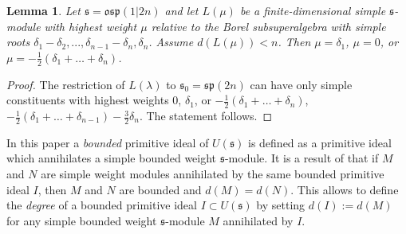 \documentclass[12pt]{amsart}
\makeatletter
\def\@putname#1#2#3#4{\def\@@ref{#3}\let\old@bf\bf
        \def\bf##1{\old@bf\if?\noexpand##1?{#4}\else##1\fi}%
	#1{#2}%
        \let\bf\old@bf}
\def\@putname#1#2#3#4{\def\@@ref{#3}\let\old@bf\bf	%
	\let\old@reset@font\reset@font			%
        \def\bf##1{\old@bf\if?\noexpand##1?{#4}\else##1\fi}%
	\def\reset@font##1##2{\old@reset@font##1\if?\noexpand##2?{#4}\else##2\fi}#1{#2}%
        \let\bf\old@bf\let\reset@font\old@reset@font}
\let\my@cite=\cite
\def\cite#1{\@putname\my@cite{#1}{\@citeb}{\tiny\rm\@@ref}}
\theoremstyle{plain} %
\numberwithin{equation}{section}
\theoremstyle{definition}
\theoremstyle{remark}
\theoremstyle{plain} %
\newtheorem{lemma}[definition]{Lemma}
\newcommand{\osp}{\mathfrak{osp}}
\newcommand{\gs}{\mathfrak{s}}
\def\gs{\mathfrak{s}}
\makeatother
\begin{document}
  \begin{lemma}\label{osp12} Let $\gs=\osp(1|2n)$ and let $L(\mu)$ be a finite-dimensional simple $\gs$-module with highest weight $\mu$ relative to the Borel subsuperalgebra with simple roots $\delta_1 - \delta_2,...,\delta_{n-1} - \delta_n, \delta_n$. Assume
    $d(L(\mu))<n$. Then $\mu=\delta_1$, $\mu=0$, or $\mu=-\frac{1}{2}(\delta_1+\dots +\delta_n)$.
  \end{lemma}
  \begin{proof} The restriction of $L(\lambda)$ to $\gs_0=\mathfrak{sp}(2n)$ can have only simple constituents with highest weights $0$, $\delta_1$, or
    $-\frac{1}{2}(\delta_1+\dots+ \delta_n)$, $-\frac{1}{2}(\delta_1+\dots+\delta_{n-1})-\frac{3}{2}\delta_n$. The statement follows.
    \end{proof}
    
    In this paper a \emph{bounded} primitive ideal of $U(\gs)$ is defined as a primitive ideal which annihilates a simple bounded weight $\gs$-module. It is a result of \cite{PSer3} that if $M$ and $N$ are simple weight modules annihilated by the same bounded primitive ideal $I$, then $M$ and $N$ are bounded and $d(M) = d(N)$. This allows to define the \emph{degree} of a bounded primitive ideal $I \subset U(\gs)$ by setting $d(I) := d(M)$ for any simple bounded weight $\gs$-module $M$ annihilated by $I$.
    
\end{document}
